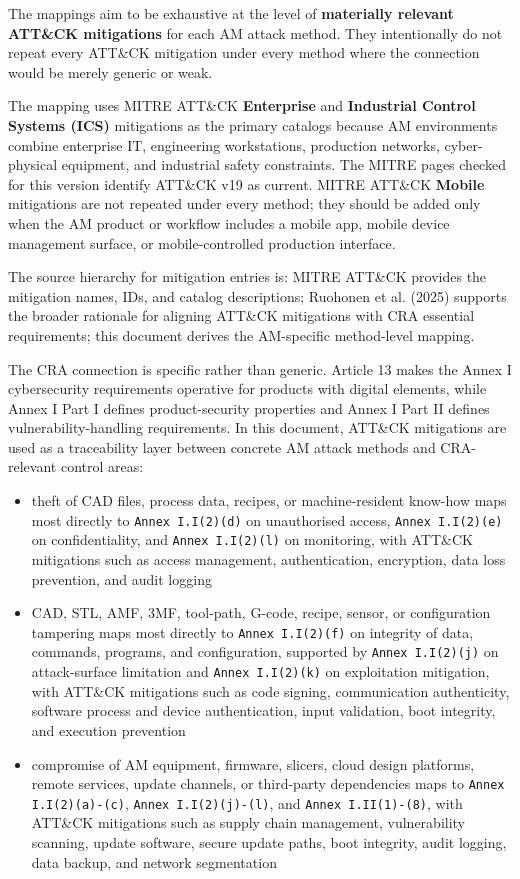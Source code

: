 \documentclass[10pt,a4paper,oneside]{report}
\begin{document}
The mappings aim to be exhaustive at the level of \textbf{materially relevant ATT\&CK mitigations} for each AM attack method. They intentionally do not repeat every ATT\&CK mitigation under every method where the connection would be merely generic or weak.

The mapping uses MITRE ATT\&CK \textbf{Enterprise} and \textbf{Industrial Control Systems (ICS)} mitigations as the primary catalogs because AM environments combine enterprise IT, engineering workstations, production networks, cyber-physical equipment, and industrial safety constraints. The MITRE pages checked for this version identify ATT\&CK v19 as current. MITRE ATT\&CK \textbf{Mobile} mitigations are not repeated under every method; they should be added only when the AM product or workflow includes a mobile app, mobile device management surface, or mobile-controlled production interface.

The source hierarchy for mitigation entries is: MITRE ATT\&CK provides the mitigation names, IDs, and catalog descriptions; Ruohonen et al. (2025) supports the broader rationale for aligning ATT\&CK mitigations with CRA essential requirements; this document derives the AM-specific method-level mapping.

The CRA connection is specific rather than generic. Article 13 makes the Annex I cybersecurity requirements operative for products with digital elements, while Annex I Part I defines product-security properties and Annex I Part II defines vulnerability-handling requirements. In this document, ATT\&CK mitigations are used as a traceability layer between concrete AM attack methods and CRA-relevant control areas:

\begin{itemize}
\item theft of CAD files, process data, recipes, or machine-resident know-how maps most directly to \texttt{Annex I.I(2)(d)} on unauthorised access, \texttt{Annex I.I(2)(e)} on confidentiality, and \texttt{Annex I.I(2)(l)} on monitoring, with ATT\&CK mitigations such as access management, authentication, encryption, data loss prevention, and audit logging
\item CAD, STL, AMF, 3MF, tool-path, G-code, recipe, sensor, or configuration tampering maps most directly to \texttt{Annex I.I(2)(f)} on integrity of data, commands, programs, and configuration, supported by \texttt{Annex I.I(2)(j)} on attack-surface limitation and \texttt{Annex I.I(2)(k)} on exploitation mitigation, with ATT\&CK mitigations such as code signing, communication authenticity, software process and device authentication, input validation, boot integrity, and execution prevention
\item compromise of AM equipment, firmware, slicers, cloud design platforms, remote services, update channels, or third-party dependencies maps to \texttt{Annex I.I(2)(a)-(c)}, \texttt{Annex I.I(2)(j)-(l)}, and \texttt{Annex I.II(1)-(8)}, with ATT\&CK mitigations such as supply chain management, vulnerability scanning, update software, secure update paths, boot integrity, audit logging, data backup, and network segmentation
\end{itemize}
\end{document}

